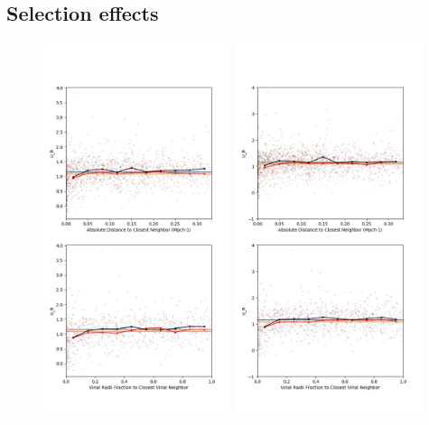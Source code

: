 \subsection{Selection effects}\label{sec:selection_effects}

\begin{figure}
    \includegraphics[width=0.49\textwidth]{Images/smallScaleEnvironment/dwarf_ur_150}
    \includegraphics[width=0.49\textwidth]{Images/smallScaleEnvironment/dwarf_ur_600}

\end{figure}
